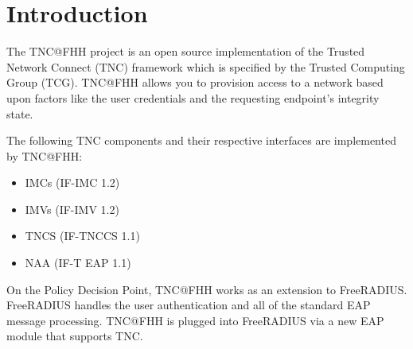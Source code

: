 \documentclass[a4paper,10pt]{scrartcl}
\begin{document}
\section{Introduction}
The TNC@FHH project is an open source implementation of the Trusted Network
Connect (TNC) framework which is specified by the Trusted Computing Group
(TCG). TNC@FHH allows you to provision access to a network based upon
factors like the user credentials and the requesting endpoint's integrity state.

The following TNC components and their respective interfaces are implemented by
TNC@FHH:
\begin{itemize}
	\item IMCs (IF-IMC 1.2)
	\item IMVs (IF-IMV 1.2)
	\item TNCS (IF-TNCCS 1.1)
	\item NAA  (IF-T EAP 1.1)
\end{itemize}

On the Policy Decision Point, TNC@FHH works as an extension to FreeRADIUS.
FreeRADIUS handles the user authentication and all of the standard EAP message
processing. TNC@FHH is plugged into FreeRADIUS via a new EAP module that
supports TNC.
\end{document}
